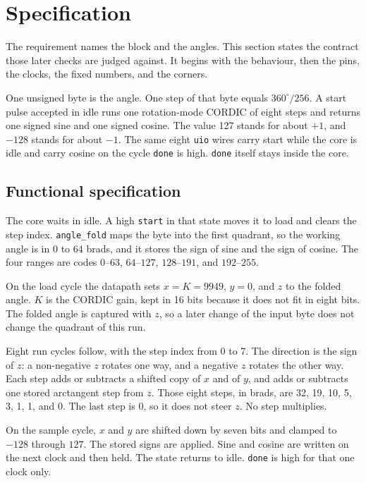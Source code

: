 \documentclass[11pt,a4paper]{article}
\begin{document}
\section{Specification}

The requirement names the block and the angles. This section states the contract those later checks are judged against. It begins with the behaviour, then the pins, the clocks, the fixed numbers, and the corners.

One unsigned byte is the angle. One step of that byte equals \(360^\circ/256\). A start pulse accepted in idle runs one rotation-mode CORDIC of eight steps and returns one signed sine and one signed cosine. The value 127 stands for about \(+1\), and \(-128\) stands for about \(-1\). The same eight \texttt{uio} wires carry start while the core is idle and carry cosine on the cycle \texttt{done} is high. \texttt{done} itself stays inside the core.

\subsection{Functional specification}
The core waits in idle. A high \texttt{start} in that state moves it to load and clears the step index. \texttt{angle\_fold} maps the byte into the first quadrant, so the working angle is in \(0\) to \(64\) brads, and it stores the sign of sine and the sign of cosine. The four ranges are codes \(0\)--\(63\), \(64\)--\(127\), \(128\)--\(191\), and \(192\)--\(255\).

On the load cycle the datapath sets \(x = K = 9949\), \(y = 0\), and \(z\) to the folded angle. \(K\) is the CORDIC gain, kept in 16 bits because it does not fit in eight bits. The folded angle is captured with \(z\), so a later change of the input byte does not change the quadrant of this run.

Eight run cycles follow, with the step index from 0 to 7. The direction is the sign of \(z\): a non-negative \(z\) rotates one way, and a negative \(z\) rotates the other way. Each step adds or subtracts a shifted copy of \(x\) and of \(y\), and adds or subtracts one stored arctangent step from \(z\). Those eight steps, in brads, are 32, 19, 10, 5, 3, 1, 1, and 0. The last step is 0, so it does not steer \(z\). No step multiplies.

On the sample cycle, \(x\) and \(y\) are shifted down by seven bits and clamped to \(-128\) through \(127\). The stored signs are applied. Sine and cosine are written on the next clock and then held. The state returns to idle. \texttt{done} is high for that one clock only.
\end{document}
